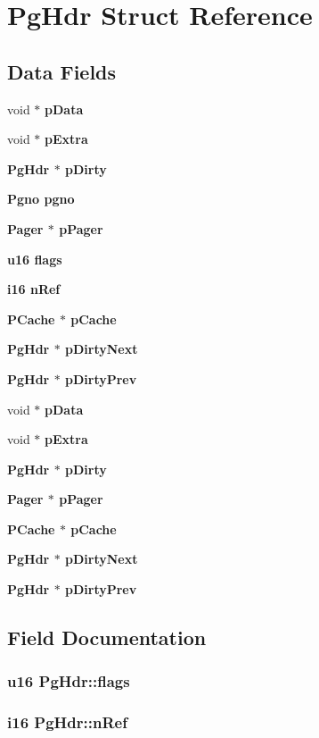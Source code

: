 \section{Pg\-Hdr Struct Reference}
\label{structPgHdr}
\subsection*{Data Fields}
\begin{CompactItemize}
\item 
void $\ast$ \bf{p\-Data}
\item 
void $\ast$ \bf{p\-Extra}
\item 
\bf{Pg\-Hdr} $\ast$ \bf{p\-Dirty}
\item 
\bf{Pgno} \bf{pgno}
\item 
\bf{Pager} $\ast$ \bf{p\-Pager}
\item 
\bf{u16} \bf{flags}
\item 
\bf{i16} \bf{n\-Ref}
\item 
\bf{PCache} $\ast$ \bf{p\-Cache}
\item 
\bf{Pg\-Hdr} $\ast$ \bf{p\-Dirty\-Next}
\item 
\bf{Pg\-Hdr} $\ast$ \bf{p\-Dirty\-Prev}
\item 
void $\ast$ \bf{p\-Data}
\item 
void $\ast$ \bf{p\-Extra}
\item 
\bf{Pg\-Hdr} $\ast$ \bf{p\-Dirty}
\item 
\bf{Pager} $\ast$ \bf{p\-Pager}
\item 
\bf{PCache} $\ast$ \bf{p\-Cache}
\item 
\bf{Pg\-Hdr} $\ast$ \bf{p\-Dirty\-Next}
\item 
\bf{Pg\-Hdr} $\ast$ \bf{p\-Dirty\-Prev}
\end{CompactItemize}


\subsection{Field Documentation}
\subsubsection{\setlength{\rightskip}{0pt plus 5cm}\bf{u16} \bf{Pg\-Hdr::flags}}\label{structPgHdr_1682cc75be6e180173b91ed4c6829656}


\subsubsection{\setlength{\rightskip}{0pt plus 5cm}\bf{i16} \bf{Pg\-Hdr::n\-Ref}}\label{structPgHdr_7e266671b7f67a238faaa1dc35572f78}



